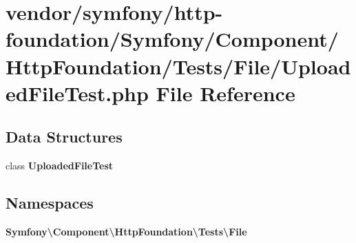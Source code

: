 \section{vendor/symfony/http-\/foundation/\+Symfony/\+Component/\+Http\+Foundation/\+Tests/\+File/\+Uploaded\+File\+Test.php File Reference}
\label{_uploaded_file_test_8php}
\subsection*{Data Structures}
\begin{DoxyCompactItemize}
\item 
class {\bf Uploaded\+File\+Test}
\end{DoxyCompactItemize}
\subsection*{Namespaces}
\begin{DoxyCompactItemize}
\item 
 {\bf Symfony\textbackslash{}\+Component\textbackslash{}\+Http\+Foundation\textbackslash{}\+Tests\textbackslash{}\+File}
\end{DoxyCompactItemize}

